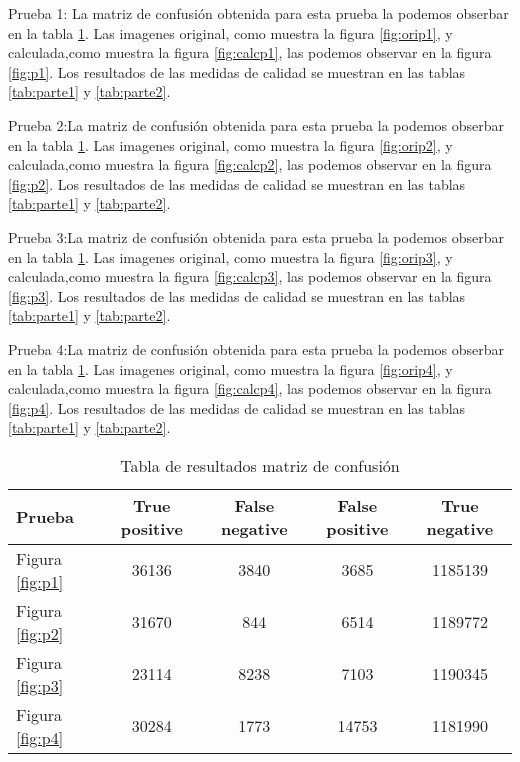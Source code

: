 Prueba 1: La matriz de confusión obtenida para esta prueba la podemos obserbar en la tabla \ref{tab:pruebas}.
Las imagenes original, como muestra la figura \ref{fig:orip1}, y calculada,como muestra la figura \ref{fig:calcp1}, las podemos observar en la figura \ref{fig:p1}.
Los resultados de las medidas de calidad se muestran en las tablas \ref{tab:parte1} y \ref{tab:parte2}.

Prueba 2:La matriz de confusión obtenida para esta prueba la podemos obserbar en la tabla \ref{tab:pruebas}.
Las imagenes original, como muestra la figura \ref{fig:orip2}, y calculada,como muestra la figura \ref{fig:calcp2}, las podemos observar en la figura \ref{fig:p2}.
Los resultados de las medidas de calidad se muestran en las tablas \ref{tab:parte1} y \ref{tab:parte2}.

Prueba 3:La matriz de confusión obtenida para esta prueba la podemos obserbar en la tabla \ref{tab:pruebas}.
Las imagenes original, como muestra la figura \ref{fig:orip3}, y calculada,como muestra la figura \ref{fig:calcp3}, las podemos observar en la figura \ref{fig:p3}.
Los resultados de las medidas de calidad se muestran en las tablas \ref{tab:parte1} y \ref{tab:parte2}.

Prueba 4:La matriz de confusión obtenida para esta prueba la podemos obserbar en la tabla \ref{tab:pruebas}.
Las imagenes original, como muestra la figura \ref{fig:orip4}, y calculada,como muestra la figura \ref{fig:calcp4}, las podemos observar en la figura \ref{fig:p4}.
Los resultados de las medidas de calidad se muestran en las tablas \ref{tab:parte1} y \ref{tab:parte2}.




\begin{table}[]
\centering
\caption{Tabla de resultados matriz de confusión}
\label{tab:pruebas}
\begin{tabular}{@{} lcccc @{}}
\hline
Prueba                & True positive & False negative & False positive & True negative \\ \hline
Figura \ref{fig:p1} & 36136         & 3840           & 3685           & 1185139       \\ \hline
Figura \ref{fig:p2} & 31670         & 844            & 6514           & 1189772       \\ \hline
Figura \ref{fig:p3} & 23114         & 8238           & 7103           & 1190345       \\ \hline
Figura \ref{fig:p4} & 30284         & 1773           & 14753          & 1181990       \\ \hline
\end{tabular}
\end{table}

